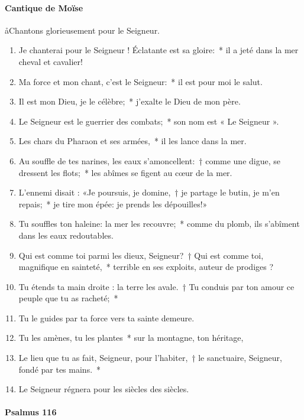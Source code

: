 \documentclass[twoside]{article}
\begin{document}
\begin{paracol}[1]{2}
\switchcolumn

\paragraph{Cantique de Moïse}

\aa Chantons glorieusement pour le Seigneur.



\begin{enumerate}[wide, itemsep=0mm, labelwidth=!, labelindent=0pt, label=\color{gregoriocolor}\theenumi]
\item Je chanterai pour le Seigneur ! Éclatante est sa gloire:~* il a jeté dans la mer cheval et cavalier!
\item Ma force et mon chant, c'est le Seigneur:~* il est pour moi le salut.
\item Il est mon Dieu, je le célèbre;~* j'exalte le Dieu de mon père.
\item Le Seigneur est le guerrier des combats;~* son nom est « Le Seigneur ».
\item Les chars du Pharaon et ses armées,~* il les lance dans la mer.
\item Au souffle de tes narines, les eaux s'amoncellent:~† comme une digue, se dressent les flots;~* les abîmes se figent au cœur de la mer.
\item L'ennemi disait : «Je poursuis, je domine,~† je partage le butin, je m'en repais;~* je tire mon épée: je prends les dépouilles!»
\item Tu souffles ton haleine: la mer les recouvre;~* comme du plomb, ils s'abîment dans les eaux redoutables.
\item Qui est comme toi parmi les dieux, Seigneur?~† Qui est comme toi, magnifique en sainteté,~* terrible en ses exploits, auteur de prodiges ?
\item Tu étends ta main droite : la terre les avale.~† Tu conduis par ton amour ce peuple que tu as racheté;~*
\item Tu le guides par ta force vers ta sainte demeure.
\item Tu les amènes, tu les plantes~* sur la montagne, ton héritage,
\item Le lieu que tu as fait, Seigneur, pour l'habiter,~† le sanctuaire, Seigneur, fondé par tes mains.~*
\item Le Seigneur régnera pour les siècles des siècles.
\end{enumerate}
\newpage%
\switchcolumn*

\paragraph{Psalmus 116}


\end{paracol}
\end{document}
